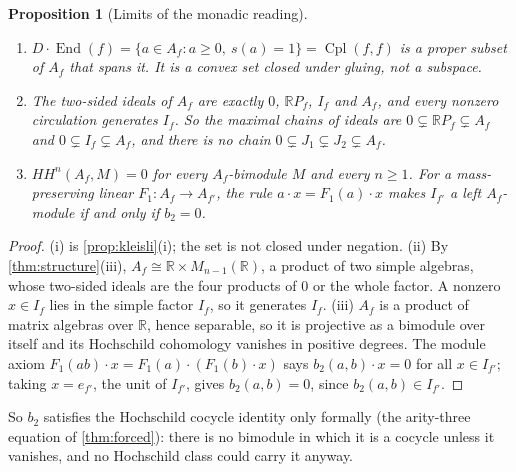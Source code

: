 \documentclass[11pt]{article}
\newtheorem{proposition}[theorem]{Proposition}
\theoremstyle{definition}
\theoremstyle{remark}
\newcommand{\R}{\mathbb{R}}
\newcommand{\Cpl}{\operatorname{Cpl}}
\begin{document}
\begin{proposition}[Limits of the monadic reading]\label{prop:monad-not}
\begin{enumerate}[label=(\roman*)]
\item $D\cdot\operatorname{End}(f)=\{a\in A_f:a\ge0,\ s(a)=1\}=\Cpl(f,f)$ is a proper subset of $A_f$ that spans it. It is a
  convex set closed under gluing, not a subspace.
\item The two-sided ideals of $A_f$ are exactly $0$, $\R P_f$, $I_f$ and $A_f$, and every nonzero circulation generates $I_f$. So the
  maximal chains of ideals are $0\subsetneq\R P_f\subsetneq A_f$ and $0\subsetneq I_f\subsetneq A_f$, and there is no chain
  $0\subsetneq J_1\subsetneq J_2\subsetneq A_f$.
\item $HH^n(A_f,M)=0$ for every $A_f$-bimodule $M$ and every $n\ge1$. For a mass-preserving linear $F_1\colon A_f\to A_{f'}$, the rule
  $a\cdot x=F_1(a)\cdot x$ makes $I_{f'}$ a left $A_f$-module if and only if $b_2=0$.
\end{enumerate}
\end{proposition}
\begin{proof}
(i) is \cref{prop:kleisli}(i); the set is not closed under negation. (ii) By \cref{thm:structure}(iii), $A_f\cong\R\times M_{n-1}(\R)$,
a product of two simple algebras, whose two-sided ideals are the four products of $0$ or the whole factor. A nonzero $x\in I_f$
lies in the simple factor $I_f$, so it generates $I_f$. (iii) $A_f$ is a product of matrix algebras over $\R$, hence separable, so
it is projective as a bimodule over itself and its Hochschild cohomology vanishes in positive degrees. The module axiom
$F_1(ab)\cdot x=F_1(a)\cdot(F_1(b)\cdot x)$ says $b_2(a,b)\cdot x=0$ for all $x\in I_{f'}$; taking $x=e_{f'}$, the unit of $I_{f'}$, gives
$b_2(a,b)=0$, since $b_2(a,b)\in I_{f'}$.
\end{proof}

So $b_2$ satisfies the Hochschild cocycle identity only formally (the arity-three equation of \cref{thm:forced}): there is no
bimodule in which it is a cocycle unless it vanishes, and no Hochschild class could carry it anyway.
\end{document}
